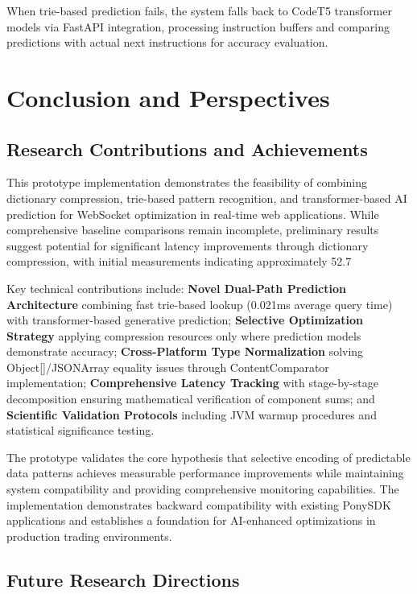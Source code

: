\documentclass[12pt,a4paper]{article}
\begin{document}
When trie-based prediction fails, the system falls back to CodeT5 transformer models via FastAPI integration, processing instruction buffers and comparing predictions with actual next instructions for accuracy evaluation.


\section{Conclusion and Perspectives}

\subsection{Research Contributions and Achievements}

This prototype implementation demonstrates the feasibility of combining dictionary compression, trie-based pattern recognition, and transformer-based AI prediction for WebSocket optimization in real-time web applications. While comprehensive baseline comparisons remain incomplete, preliminary results suggest potential for significant latency improvements through dictionary compression, with initial measurements indicating approximately 52.7%

Key technical contributions include: \textbf{Novel Dual-Path Prediction Architecture} combining fast trie-based lookup (0.021ms average query time) with transformer-based generative prediction; \textbf{Selective Optimization Strategy} applying compression resources only where prediction models demonstrate accuracy; \textbf{Cross-Platform Type Normalization} solving Object[]/JSONArray equality issues through ContentComparator implementation; \textbf{Comprehensive Latency Tracking} with stage-by-stage decomposition ensuring mathematical verification of component sums; and \textbf{Scientific Validation Protocols} including JVM warmup procedures and statistical significance testing.

The prototype validates the core hypothesis that selective encoding of predictable data patterns achieves measurable performance improvements while maintaining system compatibility and providing comprehensive monitoring capabilities. The implementation demonstrates backward compatibility with existing PonySDK applications and establishes a foundation for AI-enhanced optimizations in production trading environments.

\subsection{Future Research Directions}
\end{document}
